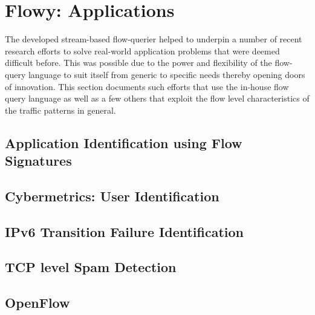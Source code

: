\chapter{Flowy: Applications}\label{ch:flowy-applications}

The developed stream-based flow-querier helped to underpin a number of recent research efforts to solve real-world application problems that were deemed difficult before. This was possible due to the power and flexibility of the flow-query language to suit itself from generic to specific needs thereby opening doors of innovation. This section documents such efforts that use the in-house flow query language as well as a few others that exploit the flow level characteristics of the traffic patterns in general. 

\section{Application Identification using Flow 
Signatures}\label{sec:application-signatures}


\section{Cybermetrics: User Identification}\label{sec:cybermetrics}
\section{IPv6 Transition Failure Identification}\label{sec:ipv6transeval}
\section{TCP level Spam Detection}\label{sec:spam-detection}
\section{OpenFlow}\label{sec:openflow}